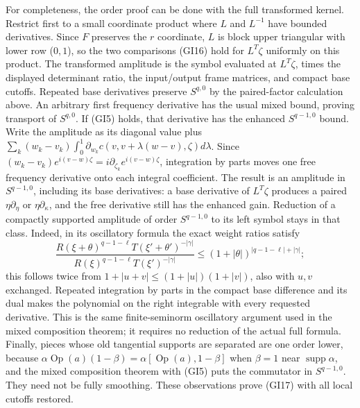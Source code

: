\documentclass[
  11pt,
]{article}
\begin{document}
For completeness, the order proof can be done with the full transformed
kernel. Restrict first to a small coordinate product where \(L\) and
\(L^{-1}\) have bounded derivatives. Since \(F\) preserves the \(r\)
coordinate, \(L\) is block upper triangular with lower row (\(0,1\)), so
the two comparisons (GI16) hold for \(L^T\zeta\) uniformly on this
product. The transformed amplitude is the symbol evaluated at
\(L^T\zeta\), times the displayed determinant ratio, the input/output
frame matrices, and compact base cutoffs. Repeated base derivatives
preserve \(S^{q,0}\) by the paired-factor calculation above. An
arbitrary first frequency derivative has the usual mixed bound, proving
transport of \(S^{q,0}\). If (GI5) holds, that derivative has the
enhanced \(S^{q-1,0}\) bound. Write the amplitude as its diagonal value
plus
\(\sum_k(w_k-v_k)\int_0^1\partial_{w_k}c(v,v+\lambda(w-v),\zeta)d\lambda\).
Since \((w_k-v_k)e^{i(v-w)\zeta}=i\partial_{\zeta_k}e^{i(v-w)\zeta}\),
integration by parts moves one free frequency derivative onto each
integral coefficient. The result is an amplitude in \(S^{q-1,0}\),
including its base derivatives: a base derivative of \(L^T\zeta\)
produces a paired \(\eta\partial_\eta\) or \(\eta\partial_\kappa\), and
the free derivative still has the enhanced gain. Reduction of a
compactly supported amplitude of order \(S^{q-1,0}\) to its left symbol
stays in that class. Indeed, in its oscillatory formula the exact weight
ratios satisfy \[
 \frac{R(\xi+\theta)^{q-1-\ell}T(\xi'+\theta')^{-|\gamma|}}
      {R(\xi)^{q-1-\ell}T(\xi')^{-|\gamma|}}
 \leq (1+|\theta|)^{|q-1-\ell|+|\gamma|};
 \tag{GI18}
\] this follows twice from \(1+|u+v|\leq(1+|u|)(1+|v|)\), also with
\(u,v\) exchanged. Repeated integration by parts in the compact base
difference and its dual makes the polynomial on the right integrable
with every requested derivative. This is the same finite-seminorm
oscillatory argument used in the mixed composition theorem; it requires
no reduction of the actual full formula. Finally, pieces whose old
tangential supports are separated are one order lower, because
\(\alpha\operatorname{Op}(a)(1-\beta)=\alpha[\operatorname{Op}(a),1-\beta]\)
when \(\beta=1\) near \(\operatorname{supp}\alpha\), and the mixed
composition theorem with (GI5) puts the commutator in \(S^{q-1,0}\).
They need not be fully smoothing. These observations prove (GI17) with
all local cutoffs restored.
\end{document}
